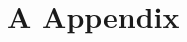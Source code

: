 \documentclass[a4paper,12pt]{article}
\numberwithin{equation}{section}
\begin{document}
%


\newpage
\section*{A \hspace{0.2cm} Appendix}
\def\theequation{A.\arabic{equation}}
\setcounter{equation}{0}
\end{document}

